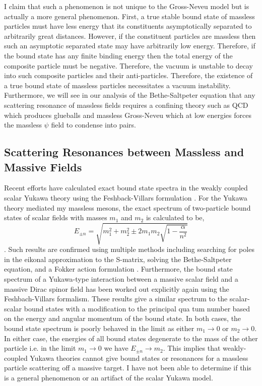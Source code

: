 \documentclass[12pt]{article}
\begin{document}
\par
I claim that such a phenomenon is not unique to the Gross-Neveu model but is actually a more general phenomenon. First, a true stable bound state of massless particles must have less energy that its constituents asymptotically separated to arbitrarily great distances. However, if the constituent particles are massless then such an asymptotic separated state may have arbitrarily low energy. Therefore, if the bound state has any finite binding energy then the total energy of the composite particle must be negative. Therefore, the vacuum is unstable to decay into such composite particles and their anti-particles. Therefore, the existence of a true bound state of massless particles necessitates a vacuum instability. Furthermore, we will see in our analysis of the Bethe-Saltpeter equation that any scattering resonance of massless fields requires a confining theory such as QCD which produces glueballs and massless Gross-Neveu which at low energies forces the massless $\psi$ field to condense into pairs. 

\subsection{Scattering Resonances between Massless and Massive Fields}

Recent efforts have calculated exact bound state spectra in the weakly coupled scalar Yukawa theory using the Feshback-Villars formulation \citep{Villars}. For the Yukawa theory mediated my massless mesons, the exact spectrum of two-particle bound states of scalar fields with masses $m_1$ and $m_2$ is calculated to be,
\begin{equation}
E_{\pm n} = \sqrt{m_1^2 + m_2^2 \pm 2 m_1 m_2 \sqrt{1 - \frac{\alpha}{n^2}}} 
\end{equation}  
\citep{two-body-coulomb}. Such results are confirmed using multiple methods including searching for poles in the eikonal approximation to the S-matrix, solving the Bethe-Saltpeter equation, and a Fokker action formulation \citep{spinor-scalar}. Furthermore, the bound state spectrum of a Yukawa-type interaction between a massive scalar field and a massive Dirac spinor field has been worked out explicitly \citep{spinor-scalar} again using the Feshbach-Villars formalism. These results give a similar spectrum to the scalar-scalar bound states with a modification to the principal qua tum number based on the energy and angular momentum of the bound state. In both cases, the bound state spectrum is poorly behaved in the limit as either $m_1 \to 0$ or $m_2 \to 0$. In either case, the energies of all bound states degenerate to the mass of the other particle i.e. in the limit $m_1 \to 0$ we have $E_{\pm n} \to m_2$. This implies that weakly-coupled Yukawa theories cannot give bound states or resonances for a massless particle scattering off a massive target. I have not been able to determine if this is a general phenomenon or an artifact of the scalar Yukawa model.  
\end{document}
